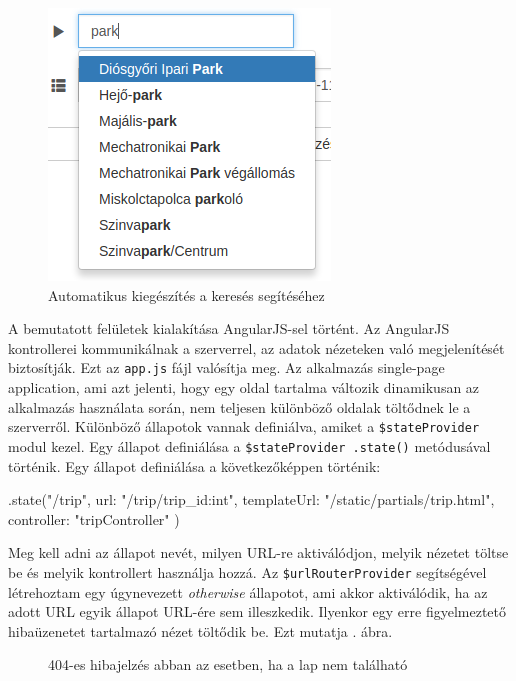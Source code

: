 \begin{figure}[h!]
\centering
\includegraphics[scale=0.6]{kepek/autocomplete.png}
\caption{Automatikus kiegészítés a keresés segítéséhez}
\label{fig:autocomplete}
\end{figure}


A bemutatott felületek kialakítása AngularJS-sel történt. Az AngularJS kontrollerei kommunikálnak a szerverrel, az adatok nézeteken való megjelenítését biztosítják. Ezt az \texttt{app.js} fájl valósítja meg.
Az alkalmazás single-page application, ami azt jelenti, hogy egy oldal tartalma változik dinamikusan az alkalmazás használata során, nem teljesen különböző oldalak töltődnek le a szerverről. Különböző állapotok vannak definiálva, amiket a \texttt{\$stateProvider} modul kezel. Egy állapot definiálása a \texttt{\$stateProvider .state()} metódusával történik.
Egy állapot definiálása a következőképpen történik:
\begin{cpp}
.state("/trip", {
            url: "/trip/{trip_id:int}",
            templateUrl: "/static/partials/trip.html",
            controller: "tripController"
        })
\end{cpp}
Meg kell adni az állapot nevét, milyen URL-re aktiválódjon, melyik nézetet töltse be és melyik kontrollert használja hozzá.
Az \texttt{\$urlRouterProvider} segítségével létrehoztam egy úgynevezett \textit{otherwise} állapotot, ami akkor aktiválódik, ha az adott URL egyik állapot URL-ére sem illeszkedik. Ilyenkor egy erre figyelmeztető hibaüzenetet tartalmazó nézet töltődik be. Ezt mutatja . ábra.

\begin{figure}[h!]
\centering
{}
\caption{404-es hibajelzés abban az esetben, ha a lap nem található}
\label{fig:404}
\end{figure}

